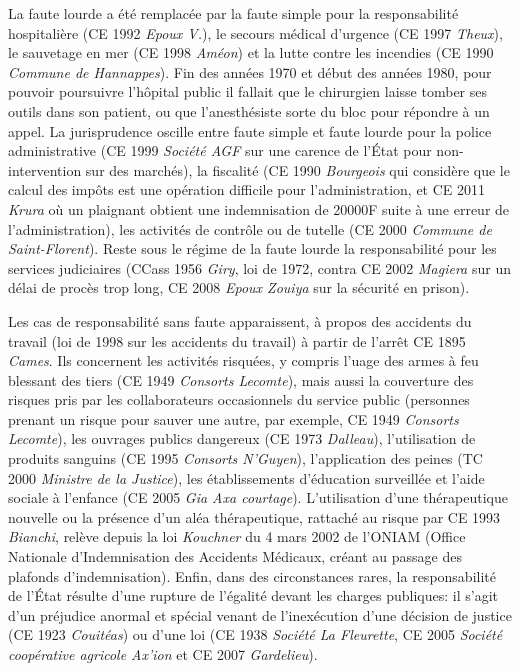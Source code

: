 \documentclass[math]{cours}
\begin{document}
La faute lourde a été remplacée par la faute simple pour la responsabilité hospitalière (CE 1992 \emph{Epoux V.}), le secours médical d'urgence (CE 1997 \emph{Theux}), le sauvetage en mer (CE 1998 \emph{Améon}) et la lutte contre les incendies (CE 1990 \emph{Commune de Hannappes}).
Fin des années 1970 et début des années 1980, pour pouvoir poursuivre l'hôpital public il fallait que le chirurgien laisse tomber ses outils dans son patient, ou que l'anesthésiste sorte du bloc pour répondre à un appel.
La jurisprudence oscille entre faute simple et faute lourde pour la police administrative (CE 1999 \emph{Société AGF} sur une carence de l'État pour non-intervention sur des marchés), la fiscalité (CE 1990 \emph{Bourgeois} qui considère que le calcul des impôts est une opération difficile pour l'administration, et CE 2011 \emph{Krura} où un plaignant obtient une indemnisation de 20000F suite à une erreur de l'administration), les activités de contrôle ou de tutelle (CE 2000 \emph{Commune de Saint-Florent}).
Reste sous le régime de la faute lourde la responsabilité pour les services judiciaires (CCass 1956 \emph{Giry}, loi de 1972, contra CE 2002 \emph{Magiera} sur un délai de procès trop long, CE 2008 \emph{Epoux Zouiya} sur la sécurité en prison).

Les cas de responsabilité sans faute apparaissent, à propos des accidents du travail (loi de 1998 sur les accidents du travail) à partir de l'arrêt CE 1895 \emph{Cames}.
Ils concernent les activités risquées, y compris l'uage des armes à feu blessant des tiers (CE 1949 \emph{Consorts Lecomte}), mais aussi la couverture des risques pris par les collaborateurs occasionnels du service public (personnes prenant un risque pour sauver une autre, par exemple, CE 1949 \emph{Consorts Lecomte}), les ouvrages publics dangereux (CE 1973 \emph{Dalleau}), l'utilisation de produits sanguins (CE 1995 \emph{Consorts N'Guyen}), l'application des peines (TC 2000 \emph{Ministre de la Justice}), les établissements d'éducation surveillée et l'aide sociale à l'enfance (CE 2005 \emph{Gia Axa courtage}).
L'utilisation d'une thérapeutique nouvelle ou la présence d'un aléa thérapeutique, rattaché au risque par CE 1993 \emph{Bianchi}, relève depuis la loi \emph{Kouchner} du 4 mars 2002 de l'ONIAM (Office Nationale d'Indemnisation des Accidents Médicaux, créant au passage des plafonds d'indemnisation).
Enfin, dans des circonstances rares, la responsabilité de l'État résulte d'une rupture de l'égalité devant les charges publiques: il s'agit d'un préjudice anormal et spécial venant de l'inexécution d'une décision de justice (CE 1923 \emph{Couitéas}) ou d'une loi (CE 1938 \emph{Société La Fleurette}, CE 2005 \emph{Société coopérative agricole Ax'ion} et CE 2007 \emph{Gardelieu}).
\end{document}
